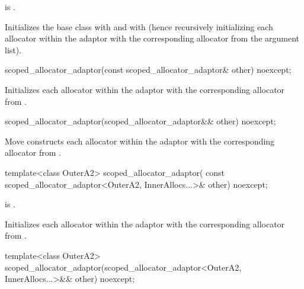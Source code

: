 \begin{itemdescr}
\pnum
\constraints
{} is .

\pnum
\effects
Initializes the  base class with
 and  with 
(hence recursively initializing each allocator within the adaptor with the corresponding
allocator from the argument list).
\end{itemdescr}

%
\begin{itemdecl}
scoped_allocator_adaptor(const scoped_allocator_adaptor& other) noexcept;
\end{itemdecl}

\begin{itemdescr}
\pnum
\effects
Initializes each allocator within the adaptor with the corresponding allocator
from .
\end{itemdescr}

%
\begin{itemdecl}
scoped_allocator_adaptor(scoped_allocator_adaptor&& other) noexcept;
\end{itemdecl}

\begin{itemdescr}
\pnum
\effects
Move constructs each allocator within the adaptor with the corresponding allocator
from .
\end{itemdescr}

%
\begin{itemdecl}
template<class OuterA2>
  scoped_allocator_adaptor(
    const scoped_allocator_adaptor<OuterA2, InnerAllocs...>& other) noexcept;
\end{itemdecl}

\begin{itemdescr}
\pnum
\constraints
{} is .

\pnum
\effects
Initializes each allocator within the adaptor with the corresponding allocator
from .
\end{itemdescr}

%
\begin{itemdecl}
template<class OuterA2>
  scoped_allocator_adaptor(scoped_allocator_adaptor<OuterA2, InnerAllocs...>&& other) noexcept;
\end{itemdecl}

